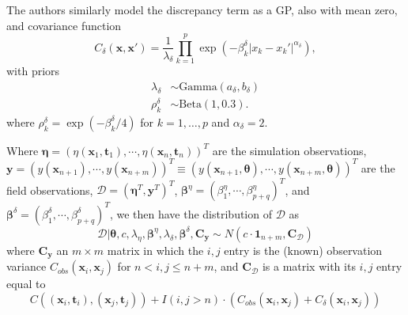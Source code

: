 \documentclass{article}
\begin{document}
The authors similarly model the discrepancy term as a GP, also with mean zero, and covariance function
%
\begin{equation}
C_\delta(\mathbf x,\mathbf x') = \frac 1{\lambda_\delta} \prod_{k=1}^p
\exp\left( -\beta_k^\delta |x_k-x_k'|^{\alpha_\delta} \right),
\end{equation}
%
with priors
%
\begin{equation}
\begin{aligned}
\lambda_\delta &\sim \mathrm{Gamma}(a_\delta,b_\delta)\\
\rho^\delta_k &\sim \mathrm{Beta}(1,0.3).
\end{aligned}
\end{equation}
%
where $\rho_k^\delta=\exp(-\beta_k^\delta/4)$ for $k=1,\ldots,p$ and $\alpha_\delta=2$.

Where $\boldsymbol \eta = (\eta(\mathbf x_1,\mathbf t_1),\cdots,\eta(\mathbf x_n,\mathbf t_n))^T$ are the simulation observations, $\mathbf y = (y(\mathbf x_{n+1}),\cdots,y(\mathbf x_{n+m}))^T\equiv (y(\mathbf x_{n+1},\boldsymbol\theta),\cdots,y(\mathbf x_{n+m},\boldsymbol\theta))^T$ are the field observations, $\mathcal D = (\boldsymbol \eta^T,\mathbf y^T)^T$, $\boldsymbol \beta^\eta = (\beta^\eta_1,\cdots,\beta_{p+q}^\eta)^T$, and $\boldsymbol \beta^\delta = (\beta^\delta_1,\cdots,\beta_{p+q}^\delta)^T$, we then have the distribution of $\mathcal D$ as 
%
\begin{equation}
\mathcal D | \boldsymbol \theta,c,\lambda_\eta, \boldsymbol \beta^\eta,\lambda_\delta,\boldsymbol \beta^\delta,\mathbf C_{\mathbf y} \sim N(c \cdot \mathbf 1_{n+m}, \mathbf C_{\mathcal D})
\end{equation}
%
where $\mathbf C_{\mathbf y}$ an $m\times m$ matrix in which the $i,j$ entry is the (known) observation variance $C_{obs}(\mathbf x_i,\mathbf x_j)$ for $n<i,j\leq n+m$, and $\mathbf C_{\mathcal D}$ is a matrix with its $i,j$ entry equal to
%
\begin{equation}\label{eq:C_D}
C((\mathbf x_i,\mathbf t_i),(\mathbf x_j,\mathbf t_j)) + I(i,j>n)\cdot(C_{obs}(\mathbf x_i,\mathbf x_j) + C_\delta(\mathbf x_i,\mathbf x_j))
\end{equation}
\end{document}

